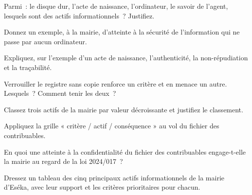 \begin{boxexo}[title={\ding{45}\quad Exercice~1.2. Actif ou support \niveaubase}]
Parmi~: le disque dur, l'acte de naissance, l'ordinateur, le savoir de l'agent,
lesquels sont des actifs informationnels~? Justifiez.
\end{boxexo}

\begin{boxexo}[title={\ding{45}\quad Exercice~1.3. Information ou informatique \niveaubase}]
Donnez un exemple, à la mairie, d'atteinte à la sécurité de l'information qui
ne passe par aucun ordinateur.
\end{boxexo}

\begin{boxexo}[title={\ding{45}\quad Exercice~1.4. Les compléments \niveaumoyen}]
Expliquez, sur l'exemple d'un acte de naissance, l'authenticité, la
non-répudiation et la traçabilité.
\end{boxexo}

\begin{boxexo}[title={\ding{45}\quad Exercice~1.5. Arbitrage \niveaumoyen}]
Verrouiller le registre sans copie renforce un critère et en menace un autre.
Lesquels~? Comment tenir les deux~?
\end{boxexo}

\begin{boxexo}[title={\ding{45}\quad Exercice~1.6. Valeur d'un actif \niveaumoyen}]
Classez trois actifs de la mairie par valeur décroissante et justifiez le
classement.
\end{boxexo}

\begin{boxexo}[title={\ding{45}\quad Exercice~1.7. Grille de lecture \niveaumoyen}]
Appliquez la grille « critère / actif / conséquence » au vol du fichier des
contribuables.
\end{boxexo}

\begin{boxexo}[title={\ding{45}\quad Exercice~1.8. Confidentialité et loi \niveaumoyen}]
En quoi une atteinte à la confidentialité du fichier des contribuables
engage-t-elle la mairie au regard de la loi 2024/017~?
\end{boxexo}

\begin{boxexo}[title={\ding{45}\quad Exercice~1.9. Cartographie \niveauexpert}]
Dressez un tableau des cinq principaux actifs informationnels de la mairie
d'Eséka, avec leur support et les critères prioritaires pour chacun.
\end{boxexo}

